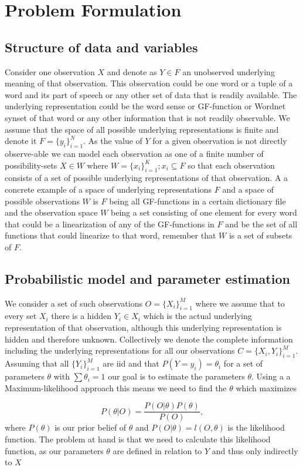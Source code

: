 \section{Problem Formulation}
\subsection{Structure of data and variables}
Consider one observation $X$ and denote as $Y\in F$ an unobserved underlying meaning of that observation. This observation could be one word or a tuple of a word and its part of speech or any other set of data that is readily available. The underlying representation could be the word sense or GF-function or Wordnet synset of that word or any other information that is not readily observable. We assume that the space of all possible underlying representations is finite and denote it $F=\{y_i\}_{i=1}^N$. As the value of $Y$ for a given observation is not directly observe-able we can model each observation as one of a finite number of possibility-sets $X\in W$ where $W=\{x_i\}_{i=1}^K; x_i\subseteq F$ so that each observation consists of a set of possible underlying representations of that observation. A a concrete example of a space of underlying representations $F$ and a space of possible observations $W$ is $F$ being all GF-functions in a certain dictionary file and the observation space $W$ being a set consisting of one element for every word that could be a linearization of any of the GF-functions in $F$ and be the set of all functions that could linearize to that word, remember that $W$ is a set of subsets of $F$.
\subsection{Probabilistic model and parameter estimation}
We consider a set of such observations $O=\{X_i\}_{i=1}^M$ where we assume that to every set $X_i$ there is a hidden $Y_i\in X_i$ which is the actual underlying representation of that observation, although this underlying representation is hidden and therefore unknown. Collectively we denote the complete information including the underlying representations for all our observations $C=\{X_i, Y_i\}_{i=1}^M$. Assuming that all $\{Y_i\}_{i=1}^M$ are iid and that $P(Y=y_i)=\theta_i$ for a set of parameters $\theta$ with $\sum \theta_i = 1$ our goal is to estimate the parameters $\theta$. Using a a Maximum-likelihood approach this means we need to find the $\theta$ which maximizes 

\begin{equation*}
P(\theta | O)=\frac{P(O | \theta)P(\theta)}{P(O)},
\end{equation*}
where $P(\theta)$ is our prior belief of $\theta$ and $P(O | \theta) = l(O,\theta)$ is the likelihood function. The problem at hand is that we need to calculate this likelihood function, as our parameters $\theta$ are defined in relation to $Y$ and thus only indirectly to $X$

